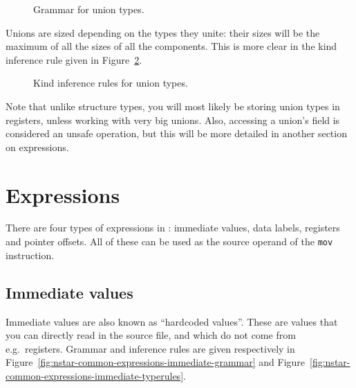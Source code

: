 \begin{figure}[htb]
  \centering


  \caption{Grammar for union types.}
  \label{fig:nstar-common-ts-unions-syntax}
\end{figure}

Unions are sized depending on the types they unite: their sizes will be the maximum of all the sizes of all the components.
This is more clear in the kind inference rule given in Figure~\ref{fig:nstar-common-ts-unions-kindrules}.

\begin{figure}[H]
  \centering


  \caption{Kind inference rules for union types.}
  \label{fig:nstar-common-ts-unions-kindrules}
\end{figure}

Note that unlike structure types, you will most likely be storing union types in registers, unless working with very big unions.
Also, accessing a union's field is considered an unsafe operation, but this will be more detailed in another section on expressions.

\section{Expressions}\label{sec:nstar-common-expressions}

There are four types of expressions in \nstar: immediate values, data labels, registers and pointer offsets.
All of these can be used as the source operand of the \texttt{mov} instruction.

\subsection{Immediate values}\label{subsec:nstar-common-expressions-immediate}

Immediate values are also known as ``hardcoded values''.
These are values that you can directly read in the source file, and which do not come from e.g.\ registers.
Grammar and inference rules are given respectively in Figure~\ref{fig:nstar-common-expressions-immediate-grammar} and Figure~\ref{fig:nstar-common-expressions-immediate-typerules}.


